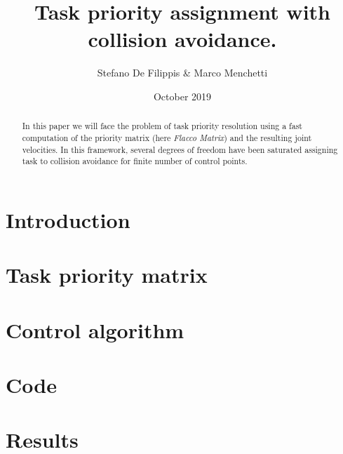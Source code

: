 \documentclass[12pt,a4paper, twocolumn, twoside]{article}
\begin{document}
	
	\title{Task priority assignment with collision avoidance.}
	\author{Stefano De Filippis \& Marco Menchetti}
	\date{October 2019}
	\maketitle
	
\begin{abstract}
	In this paper we will face the problem of task priority resolution using a fast computation of the priority matrix (here \textit{Flacco Matrix}) and the resulting joint velocities.
	In this framework, several degrees of freedom have been saturated assigning task to collision avoidance for finite number of control points.
\end{abstract}
\section*{Introduction}
\section{Task priority matrix}
\section{Control algorithm}
\section{Code}
\section{Results}
\tableofcontents
\end{document}
